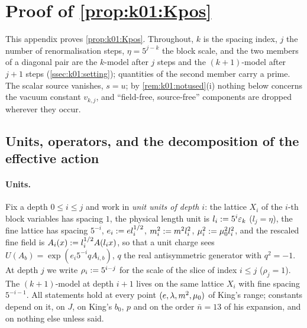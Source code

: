 \providecommand{\moving}[1]{\textcolor{orange!80!black}{[#1]}}
\providecommand{\Kpos}{\ensuremath{(\mathrm{K}\text{-}\mathrm{pos})_{N}}}
\providecommand{\Zk}{\ensuremath{Z_{k}}}
\providecommand{\nbar}{\ensuremath{\bar n}}
\providecommand{\Dsp}{\ensuremath{D^{\mathrm{sp}}}}
\providecommand{\DEG}{\ensuremath{(\mathrm{DEG})}}
\providecommand{\DEGB}{\ensuremath{(\mathrm{DEG}^{B})}}
\providecommand{\lay}[3]{\ensuremath{\mathcal L(#1;#2,#3)}}
\providecommand{\DelG}{\ensuremath{\Delta G}}

\section{Proof of \texorpdfstring{\cref{prop:k01:Kpos}}{the one-step bound on the normalised action}}\label{app:a02_Kpos}

This appendix proves \cref{prop:k01:Kpos}. Throughout, $k$ is the spacing index, $j$ the number of renormalisation steps, $\eta=5^{j-k}$ the block scale, and the two members of a diagonal pair are the $k$-model after $j$ steps and the $(k+1)$-model after $j+1$ steps (\cref{ssec:k01:setting}); quantities of the second member carry a prime. The scalar source vanishes, $s=u$; by \cref{rem:k01:notused}(i) nothing below concerns the vacuum constant $v_{k,j}$, and ``field-free, source-free'' components are dropped wherever they occur.

\subsection{Units, operators, and the decomposition of the effective action}\label{ssec:a02:setting}

\paragraph{Units.} Fix a depth $0\le i\le j$ and work in \emph{unit units of depth $i$}: the lattice $X_i$ of the $i$-th block variables has spacing $1$, the physical length unit is $l_i:=5^i\varepsilon_k$ ($l_j=\eta$), the fine lattice has spacing $5^{-i}$, $e_i:= el_i^{1/2}$, $m_i^2:= m^2l_i^2$, $\mu_i^2:=\mu_0^2l_i^2$, and the rescaled fine field is $A_i(x):= l_i^{1/2}A(l_ix)$, so that a unit charge sees $U(A_b)=\exp(e_i5^{-i}qA_{i,b})$, $q$ the real antisymmetric generator with $q^2=-1$. At depth $j$ we write $\rho_i:=5^{i-j}$ for the scale of the slice of index $i\le j$ ($\rho_j=1$). The $(k+1)$-model at depth $i+1$ lives on the same lattice $X_i$ with fine spacing $5^{-i-1}$. All statements hold at every point $(e,\lambda,m^2,\mu_0)$ of King's range; constants depend on it, on $J$, on King's $b_0$, $p$ and on the order $\nbar=13$ of his expansion, and on nothing else unless said.

